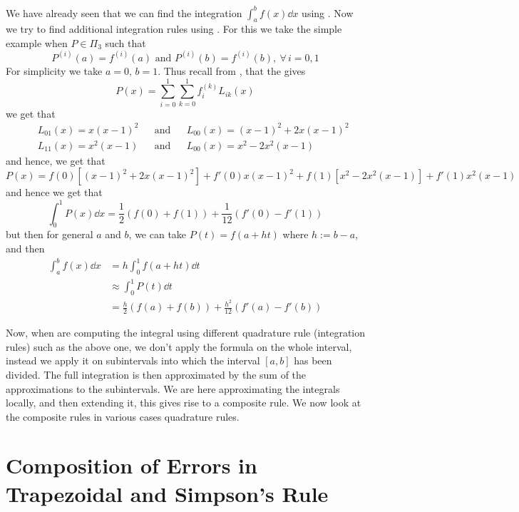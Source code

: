 
We have already seen that we can find the integration $\int_a^b f(x) \dd{x}$ using . Now we try to find additional integration rules using . For this we take the simple example when $P \in \Pi_3$ such that 
\begin{equation}\label{eq1:apr4A}
    P^{(i)}(a) = f^{(i)}(a) \mbox{ and } P^{(i)}(b) = f^{(i)}(b), \ \forall \, i = 0,1 
\end{equation}
For simplicity we take $a=0, \, b = 1$. Thus recall from , that the  gives 
\[
    P(x) = \sum_{i=0}^1 \sum_{k=0}^1 f_i^{(k)} L_{ik}(x)  
\]
we get that 
\begin{align*}
    &&L_{01}(x) = x(x-1)^2 &&\mbox{and}  &&L_{00}(x) = (x-1)^2 +2x(x-1)^2 \\ 
    &&L_{11}(x) = x^2(x-1) &&\mbox{and}  &&L_{00}(x) = x^2 -2x^2(x-1) 
\end{align*}
and hence, we get that 
\[
    P(x) = f(0)[(x-1)^2 + 2x(x-1)^2] + f'(0)x(x-1)^2 + f(1)[x^2 - 2x^2(x-1)] + f'(1)x^2(x-1)
\]
and hence we get that 
\[
    \int_0^1 P(x) \dd{x} = \frac{1}{2}(f(0) + f(1)) + \frac{1}{12} (f'(0) - f'(1))  
\]
but then for general $a$ and $b$, we can take $P(t) = f(a+ht)$ where $h := b-a$, and then 
\begin{align*}
    \int_a^b f(x) \dd{x} 
    &= h\int_0^1 f(a + ht) \dd{t} \\
    &\approx \int_0^1 P(t) \dd{t} \\ 
    &= \frac{h}{2}(f(a) + f(b)) + \frac{h^2}{12} (f'(a) - f'(b)) 
\end{align*}

Now, when are computing the integral using different quadrature rule (integration rules) such as the above  one, we don't apply the formula on the whole interval, instead we apply it on subintervals into which the interval $[a,b]$ has been divided. The full integration is then approximated by the sum of the approximations to the subintervals. We are here approximating the integrals locally, and then extending it, this gives rise to a composite rule. We now look at the composite rules in various cases quadrature rules.

\section{Composition of Errors in Trapezoidal and Simpson's Rule }

